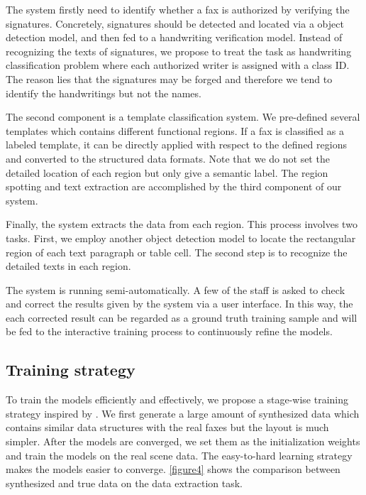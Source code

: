 \documentclass[sigconf]{acmart}
\begin{document}
The system firstly need to identify whether a fax is authorized by verifying the signatures. Concretely, signatures should be detected and located via a object detection model, and then fed to a handwriting verification model. Instead of recognizing the texts of signatures, we propose to treat the task as handwriting classification problem where each authorized writer is assigned with a class ID. The reason lies that the signatures may be forged and therefore we tend to identify the handwritings but not the names. 

The second component is a template classification system. We pre-defined several templates which contains different functional regions. If a fax is classified as a labeled template, it can be directly applied with respect to the defined regions and converted to the structured data formats. Note that we do not set the detailed location of each region but only give a semantic label. The region spotting and text extraction are accomplished by the third component of our system.

Finally, the system extracts the data from each region. This process involves two tasks. First, we employ another object detection model to locate the rectangular region of each text paragraph or table cell. The second step is to recognize the detailed texts in each region.

The system is running semi-automatically. A few of the staff is asked to check and correct the results given by the system via a user interface. In this way, the each corrected result can be regarded as a ground truth training sample and will be fed to the interactive training process to continuously refine the models.

\subsection{Training strategy}
To train the models efficiently and effectively, we propose a stage-wise training strategy inspired by \cite{bengio2009curriculum}. We first generate a large amount of synthesized data which contains similar data structures with the real faxes but the layout is much simpler. After the models are converged, we set them as the initialization weights and train the models on the real scene data. The easy-to-hard learning strategy makes the models easier to converge. \ref{figure4} shows the comparison between synthesized and true data on the data extraction task.
\end{document}
